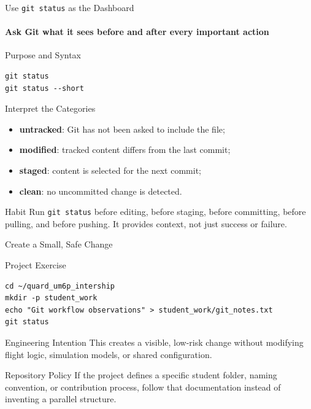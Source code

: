 \begin{frame}[fragile]{Use \texttt{git status} as the Dashboard}
\framesubtitle{Ask Git what it sees before and after every important action}
\footnotesize
\begin{block}{Purpose and Syntax}
\begin{verbatim}
git status
git status --short
\end{verbatim}
\end{block}
\begin{exampleblock}{Interpret the Categories}
\begin{itemize}\setlength{\itemsep}{0.18em}
\item \textbf{untracked}: Git has not been asked to include the file;
\item \textbf{modified}: tracked content differs from the last commit;
\item \textbf{staged}: content is selected for the next commit;
\item \textbf{clean}: no uncommitted change is detected.
\end{itemize}
\end{exampleblock}
\begin{alertblock}{Habit}
Run \texttt{git status} before editing, before staging, before committing, before pulling, and before pushing. It provides context, not just success or failure.
\end{alertblock}
\end{frame}

\begin{frame}[fragile]{Create a Small, Safe Change}
\footnotesize
\begin{exampleblock}{Project Exercise}
\begin{verbatim}
cd ~/quard_um6p_intership
mkdir -p student_work
echo "Git workflow observations" > student_work/git_notes.txt
git status
\end{verbatim}
\end{exampleblock}
\begin{block}{Engineering Intention}
This creates a visible, low-risk change without modifying flight logic, simulation models, or shared configuration.
\end{block}
\begin{alertblock}{Repository Policy}
If the project defines a specific student folder, naming convention, or contribution process, follow that documentation instead of inventing a parallel structure.
\end{alertblock}
\end{frame}


